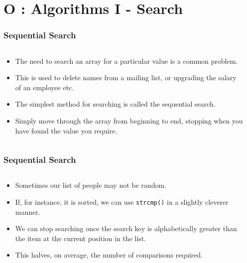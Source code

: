 \section{O : Algorithms I - Search}
\label{chap:algossearch}


\begin{frame}[fragile]
\frametitle{Sequential Search}
\begin{columns}[T]

\begin{column}{0.35\textwidth}
\begin{itemize}[<+->]
\item The need to search an array for a particular value is a common problem.
\item This is used to delete names from a mailing list, or upgrading the salary of an employee etc.
\item The simplest method for searching is called the sequential search.
\item Simply move through the array from beginning to end, stopping when you have found the value you require.
\end{itemize}
\end{column}

\pause
\begin{column}{0.55\textwidth}

\end{column}

\end{columns}
\end{frame}



\begin{frame}[fragile]
\frametitle{Sequential Search}
\begin{columns}[T]

\begin{column}{0.35\textwidth}
\begin{itemize}[<+->]
\item Sometimes our list of people may not be random.
\item If, for instance, it is sorted, we can use \verb^strcmp()^ in a slightly cleverer manner.
\item We can stop searching once the search key is alphabetically greater than the item at the current position in the list.
\item This halves, on average, the number of comparisons required.
\end{itemize}
\end{column}

\pause
\begin{column}{0.55\textwidth}

\end{column}

\end{columns}
\end{frame}

